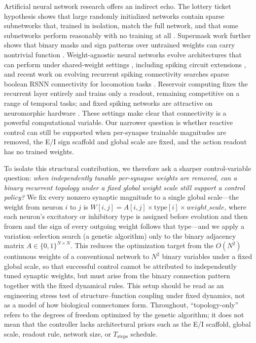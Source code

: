 \documentclass[10pt]{article}
\begin{document}
Artificial neural network research offers an indirect echo. The lottery ticket
hypothesis \citep{frankle2019,frankle2020} shows that large randomly
initialized networks contain sparse subnetworks that, trained in isolation,
match the full network, and that some subnetworks perform reasonably with no
training at all \citep{ramanujan2020}. Supermask work further shows that binary
masks and sign patterns over untrained weights can carry nontrivial function
\citep{zhou2019}. Weight-agnostic neural networks evolve architectures that can
perform under shared-weight settings \citep{gaier2019}, including spiking
circuit extensions \citep{anwar2021}, and recent work on evolving recurrent
spiking connectivity searches sparse boolean RSNN connectivity for locomotion
tasks \citep{wang2023}. Reservoir computing
\citep{jaeger2001,maass2002,lukosevicius2009,tanaka2019} fixes the recurrent
layer entirely and trains only a readout, remaining competitive on a range of
temporal tasks; and fixed spiking networks are attractive on neuromorphic
hardware \citep{davies2018,roy2019}. These settings make clear that
connectivity is a powerful computational variable. Our narrower question is
whether reactive control can still be supported when per-synapse trainable
magnitudes are removed, the E/I sign scaffold and global scale are fixed, and
the action readout has no trained weights.

To isolate this structural contribution, we therefore ask a sharper
control-variable question: \emph{when independently tunable per-synapse weights
are removed, can a binary recurrent topology under a fixed global weight scale
still support a control policy?} We fix every nonzero
synaptic magnitude to a single global
scale---the weight from neuron $i$ to $j$ is
$W[i,j]=A[i,j]\times\text{type}[i]\times\mathit{weight\_scale}$, where each
neuron's excitatory or inhibitory type is assigned before evolution and then
frozen and the sign of every outgoing weight follows that type---and we apply a
variation--selection search (a genetic algorithm) only to the binary adjacency
matrix $A\in\{0,1\}^{N\times N}$. This reduces the optimization target from the
$O(N^2)$ continuous weights of a conventional network to $N^2$ binary variables
under a fixed global scale, so that successful control cannot be attributed to
independently tuned synaptic weights, but must arise from the binary connection
pattern together with the fixed dynamical rules. This setup should be read as
an engineering stress test of structure--function coupling under fixed
dynamics, not as a model of how biological connectomes form. Throughout,
``topology-only'' refers to the degrees of freedom optimized by the genetic
algorithm; it does not mean that the controller lacks architectural priors such
as the E/I scaffold, global scale, readout rule, network size, or
$T_\text{steps}$ schedule.
\end{document}
